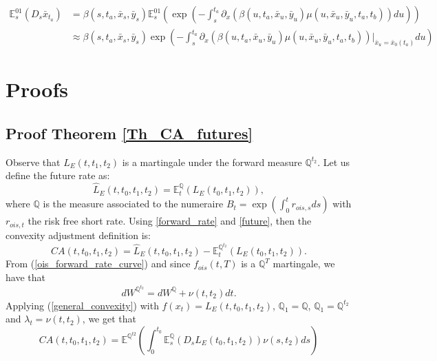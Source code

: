 \documentclass[a4paper,10pt]{article}
\newcommand{\1}{\mathbf{1}}
\begin{document}
\begin{align}\label{approximation_E_01_Ds_x_t}
\mathbb{E}^{01}_s\left(D_s \bar{x}_{t_a}\right) &= \beta(s,t_a,\bar{x}_s,\bar{y}_s)  \mathbb{E}_s^{01}\left(\exp\left(-\int_{s}^{t_a}\partial_x (\beta(u,t_a,\bar{x}_u,\bar{y}_u) \mu(u,\bar{x}_u, \bar{y}_u,t_a,t_b)) du \right)\right) \nonumber \\
&\approx \beta(s,t_a,\bar{x}_s,\bar{y}_s) \exp\left(-\int_{s}^{t_a}\partial_x (\beta(u,t_a,\bar{x}_u,\bar{y}_u) \mu(u,\bar{x}_u, \bar{y}_u,t_a,t_b))|_{\bar{x}_u=\bar{x}_{0}(t_a)}  du \right)
\end{align}

\section{Proofs}
\subsection{Proof Theorem \ref{Th_CA_futures}}\label{Proof_CA_futures}
Observe that $L_{E}(t, t_1, t_2)$ is a martingale under the forward measure $\mathbb{Q}^{t_2}$. Let us define the future rate as:    
\begin{equation}\label{future}
\hat{L}_{E}(t,t_0, t_1, t_2) = \mathbb{E}_t^{\mathbb{Q}}\left(L_{E}(t_0, t_1, t_2) \right), 
\end{equation}
where $\mathbb{Q}$ is the measure associated to the numeraire $B_t=\exp\left(\int_{0}^{t} r_{ois, s} ds \right)$ with $ r_{ois, t}$ the risk free short rate. Using
\eqref{forward_rate} and \eqref{future}, then the convexity adjustment definition is:
\begin{equation*}
CA(t, t_0, t_1, t_2) = \hat{L}_{E}(t,t_0, t_1, t_2) - \mathbb{E}_t^{\mathbb{Q}^{t_2}}\left(L_{E}(t_0, t_1, t_2) \right).
\end{equation*}
From (\ref{ois_forward_rate_curve}) and since $f_{ois}(t,T)$ is a $\mathbb{Q}^{T}$ martingale, we have that
\begin{equation}\label{girsanov_spot_forward}
dW^{\mathbb{Q}^{t_2}} = dW^{\mathbb{Q}} + \nu(t,t_2) dt. 
\end{equation}
Applying (\ref{general_convexity}) with $f(x_t)=L_{E}(t,t_0, t_1, t_2)$, $\mathbb{Q}_1=\mathbb{Q}$, $\mathbb{Q}_1=\mathbb{Q}^{t_2}$ and $\lambda_t = \nu(t,t_2)$,  we get that
\begin{equation}\label{ca_general_future}
CA(t, t_0, t_1, t_2) = \mathbb{E}^{\mathbb{Q}^{t2}}\left(\int_{0}^{t_0} \mathbb{E}^{\mathbb{Q}}_{s}\left(D_s L_{E}(t_0,t_1,t_2) \right) \nu(s,t_2) ds \right)
\end{equation}
\end{document}
